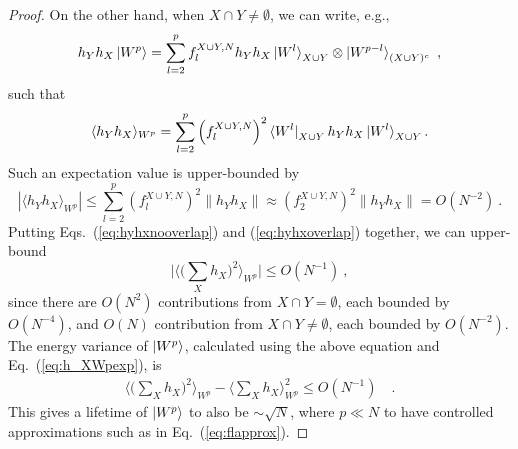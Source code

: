 \documentclass[10pt,a4paper]{amsart}
\begin{document}
\begin{proof}
    On the other hand, when $X \cap Y \neq \emptyset$, we can write, e.g., 
    \begin{equation}
        h_Y h_X \ket{W^p} = \sum_{l=2}^p f_l^{X\cup Y,N} h_Y h_X \ket{W^l}_{X\cup Y} \otimes \ket{W^{p-l}}_{(X\cup Y)^c} ~,
    \end{equation}
    such that
    \begin{equation}
        \langle h_Y h_X\rangle_{W^p}=\sum_{l=2}^{p} \left(f_{l}^{X\cup Y,N}\right)^2\bra{W^l}_{X\cup Y}  h_Y h_X\ket{W^l}_{X\cup Y}.
    \end{equation}
    Such an expectation value is upper-bounded by
    \begin{equation}
        |\langle h_Y h_X\rangle_{W^p}| \leq \sum_{l=2}^{p} \left(f_{l}^{X\cup Y,N}\right)^2 \|h_Y h_X\|
        \approx \left(f_{2}^{X\cup Y,N}\right)^2  \|h_Y h_X\| = O(N^{-2}) ~.
        \label{eq:hyhxoverlap}
    \end{equation}
    Putting Eqs.~(\ref{eq:hyhxnooverlap}) and (\ref{eq:hyhxoverlap}) together, we can upper-bound
    \begin{equation}
        \big|\big\langle \big(\sum_X h_X \big)^2\big\rangle_{W^p}\big| \leq O(N^{-1}) ~,
    \end{equation}
    since there are $O(N^2)$ contributions from $X \cap Y = \emptyset$, each bounded by $O(N^{-4})$, and $O(N)$ contribution from $X \cap Y \neq \emptyset$, each bounded by $O(N^{-2})$.
    The energy variance of $\ket{W^p}$, calculated using the above equation and Eq.~(\ref{eq:h_XWpexp}), is
    \begin{align}
        \big\langle \big(\sum_X h_X \big)^2\big\rangle_{W^p}-\big\langle \sum_X h_X \big\rangle_{W^p}^2 \leq O(N^{-1}) \quad.
    \end{align}
    This gives a lifetime of $\ket{W^p}$ to also be $\sim \sqrt{N}$, where $p \ll N$ to have controlled approximations such as in Eq.~(\ref{eq:flapprox}).
\end{proof}
\end{document}
